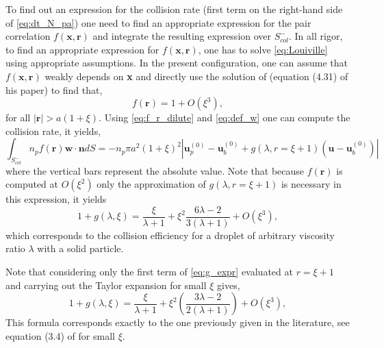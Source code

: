 To find out an expression for the collision rate (first term on the right-hand side of \eqref{eq:dt_N_pa}) one need to find an appropriate expression for the pair correlation $f(\textbf{x},\textbf{r})$ and integrate the resulting expression over $S_{col}^-$.
In all rigor, to find an appropriate expression for $f(\textbf{x},\textbf{r})$, one has to solve \eqref{eq:Louiville} using appropriate assumptions.  
In the present configuration, one can assume that $f(\textbf{x},\textbf{r})$ weakly depends on \textbf{x} and directly use the solution of \citet{batchelor1982sedimentation} (equation (4.31) of his paper) to find that, 
\begin{equation}
    f(\textbf{r}) = 1  + O(\xi^3), 
    \label{eq:f_r_dilute}
\end{equation}
for all $|\textbf{r}| > a(1+\xi)$. 
Using \eqref{eq:f_r_dilute} and \eqref{eq:def_w} one can compute the collision rate, it yields, 
\begin{equation} 
    \int_{S_{col}^-} 
    n_p f(\textbf{r}) \textbf{w}\cdot \textbf{n} dS
    =
    - n_p \pi a^2(1+\xi)^2 
        \left|\textbf{u}_p^{(0)}  - \textbf{u}_b^{(0)} + g(\lambda,r=\xi+1) (\textbf{u} - \textbf{u}_b^{(0)})\right|
\end{equation} 
where the vertical bars represent the absolute value. 
Note that because $f(\textbf{r})$ is computed at $O(\xi^2)$ only the approximation of $g(\lambda,r=\xi+1)$ is necessary in this expression, it yields
\begin{equation}
    1+g(\lambda,\xi)
    =
    \frac{\xi}{\lambda + 1} + \xi^2  \frac{6\lambda - 2}{3(\lambda+1)}
    + O(\xi^3),
    \label{eq:final_Ec}
\end{equation}
which corresponds to the collision efficiency for a droplet of arbitrary viscosity ratio $\lambda$ with a solid particle. 

Note that considering only the first term of \eqref{eq:g_expr} evaluated at $r=\xi+1$ and carrying out the Taylor expansion for small $\xi$ gives, 
\begin{equation}
    1+ g(\lambda,\xi)
    =
    \frac{\xi}{\lambda+1}
    +\xi^2 \left(
        \frac{3\lambda-2}{2(\lambda+1)}
    \right)
    + O(\xi^3),
    \label{eq:Ec_without_Faxen}
\end{equation}
 This formula corresponds exactly to the one previously given in the literature, see equation (3.4)  of \citep{loewenberg1994flotation} for small $\xi$. %
 

